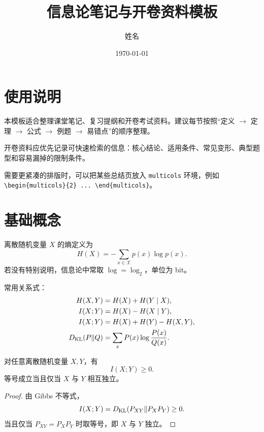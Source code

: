 \documentclass{notes}
\title{信息论笔记与开卷资料模板}
\author{姓名}
\date{\today}
\begin{document}
\maketitle
\tableofcontents
\newpage

\section{使用说明}

本模板适合整理课堂笔记、复习提纲和开卷考试资料。建议每节按照“定义 $\to$ 定理 $\to$ 公式 $\to$ 例题 $\to$ 易错点”的顺序整理。

\begin{keypoint}
开卷资料应优先记录可快速检索的信息：核心结论、适用条件、常见变形、典型题型和容易漏掉的限制条件。
\end{keypoint}

\begin{hintBox}
需要更紧凑的排版时，可以把某些总结页放入 \verb|multicols| 环境，例如 \verb|\begin{multicols}{2} ... \end{multicols}|。
\end{hintBox}

\section{基础概念}

\begin{definition}[熵]
离散随机变量 $X$ 的熵定义为
\[
  H(X) = -\sum_{x \in \mathcal{X}} p(x) \log p(x).
\]
若没有特别说明，信息论中常取 $\log = \log_2$，单位为 bit。
\end{definition}

\begin{formulaBox}
常用关系式：
\begin{align*}
  H(X,Y) &= H(X) + H(Y \mid X), \\
  I(X;Y) &= H(X) - H(X \mid Y), \\
  I(X;Y) &= H(X) + H(Y) - H(X,Y), \\
  D_{\mathrm{KL}}(P\|Q) &= \sum_x P(x) \log \frac{P(x)}{Q(x)}.
\end{align*}
\end{formulaBox}

\begin{theorem}[互信息非负]
对任意离散随机变量 $X,Y$，有
\[
  I(X;Y) \ge 0.
\]
等号成立当且仅当 $X$ 与 $Y$ 相互独立。
\end{theorem}

\begin{proof}
由 Gibbs 不等式，
\[
  I(X;Y) = D_{\mathrm{KL}}(P_{XY}\|P_XP_Y) \ge 0.
\]
当且仅当 $P_{XY}=P_XP_Y$ 时取等号，即 $X$ 与 $Y$ 独立。
\end{proof}
\end{document}
